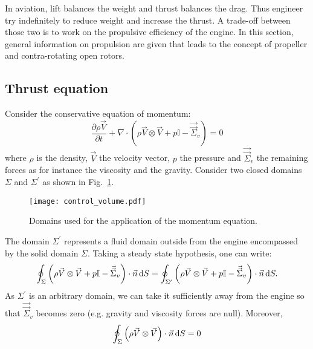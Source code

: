 
In aviation, lift balances the weight and 
thrust balances the drag. Thus engineer try
indefinitely to reduce weight and increase the
thrust. A trade-off between those two is to work
on the propulsive efficiency of the engine. In this
section, general information on propulsion are given
that leads to the concept of propeller and
contra-rotating open rotors.

\subsection{Thrust equation}
\label{sub:cror_thrust}

Consider the conservative equation of momentum:
\begin{equation}
	\frac{\partial \rho \vec{V}}{\partial t} 
	+ \nabla \cdot (\rho \vec{V} \otimes \vec{V} + p \mathbb{I} - \vec{\vec{\Sigma}}_v) = 0
\end{equation}
where $\rho$ is the density, $\vec{V}$ the velocity vector, $p$ the pressure and
$\vec{\vec{\Sigma}}_v$ the remaining forces as for instance the viscosity and
the gravity.
Consider two closed domains $\Sigma$ and $\Sigma^\prime$ as
shown in Fig.~\ref{fig:cror_control_volume}.
\begin{figure}[htb]
  \centering
  \texttt{[image: control\_volume.pdf]}
  \caption{Domains used for the application of the momentum equation.}
  \label{fig:cror_control_volume}
\end{figure}
The domain $\Sigma^\prime$ represents a fluid domain outside from the
engine encompassed by the solid domain $\Sigma$.
Taking a steady state hypothesis, one can write:
\begin{equation}
	\oint_{\Sigma} \left(\rho \vec{V} \otimes \vec{V} + 
	                       p \mathbb{I} - 
	                       \vec{\vec{\Sigma}}_v \right) \cdot \vec{n} \mathop{}\!\mathrm{d} S
    =
   	\oint_{\Sigma^\prime} \left(\rho \vec{V} \otimes \vec{V} + 
	                       p \mathbb{I} - 
	                       \vec{\vec{\Sigma}}_v \right) \cdot \vec{n} \mathop{}\!\mathrm{d} S.
\end{equation} 
As $\Sigma^\prime$ is an arbitrary domain, we can take it sufficiently
away from the engine so that $\vec{\vec{\Sigma}}_v$ becomes zero (e.g.
gravity and viscosity forces are null).
Moreover, 
\begin{equation}
	\oint_{\Sigma} \left(\rho \vec{V} \otimes \vec{V} \right) \cdot \vec{n} \mathop{}\!\mathrm{d} S = 0
\end{equation}
